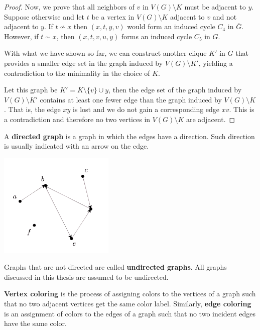 \documentclass[11pt]{article}
\theoremstyle{definition}
\begin{document}
\begin{proof}
Now, we prove that all neighbors of $v$ in $V(G) \setminus K$ must be adjacent to $y$. Suppose otherwise and let $t$ be a vertex in $V(G) \setminus K$ adjacent to $v$ and not adjacent to $y$. If $t \not\sim x$ then $(x, t, y, v)$ would form an induced cycle $C_4$ in $\overline{G}$. However, if $t \sim x$, then $(x, t, v, u, y)$ forms an induced cycle $C_5$ in $G$.

With what we have shown so far, we can construct another clique $K'$ in $G$ that provides a smaller edge set in the graph induced by $V(G) \setminus K'$, yielding a contradiction to the minimality in the choice of $K$.

Let this graph be $K' = K \setminus \{v\} \cup y$, then the edge set of the graph induced by $V(G) \setminus K'$ contains at least one fewer edge than the graph induced by $V(G) \setminus K$. That is, the edge $xy$ is lost and we do not gain a corresponding edge $xv$. This is a contradiction and therefore no two vertices in $V(G) \setminus K$ are adjacent. 
\end{proof}

A \textbf{directed graph} is a graph in which the edges have a direction. Such direction is usually indicated with an arrow on the edge.

\begin{center}
    \centering
    \includegraphics[width=\textwidth, height=5cm, keepaspectratio=true]{images/directed.jpeg}
    \label{fig:directed}
\end{center}

Graphs that are not directed are called \textbf{undirected graphs}. All graphs discussed in this thesis are assumed to be undirected. 

\textbf{Vertex coloring} is the process of assigning colors to the vertices of a graph such that no two adjacent vertices get the same color label. Similarly, \textbf{edge coloring} is an assignment of colors to the edges of a graph such that no two incident edges have the same color.
\end{document}
